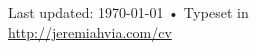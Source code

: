 \documentclass[10pt, a4paper]{article}
\begin{document}




\vfill{}
\begin{center}
  {\scriptsize  Last updated: \today\- •\-
    Typeset in \href{http://nitens.org/taraborelli/cvtex}{
      \XeTeX }\\
    \href{http://jeremiahvia.com/cv/cv.pdf}{http://jeremiahvia.com/cv}}
\end{center}
\end{document}
